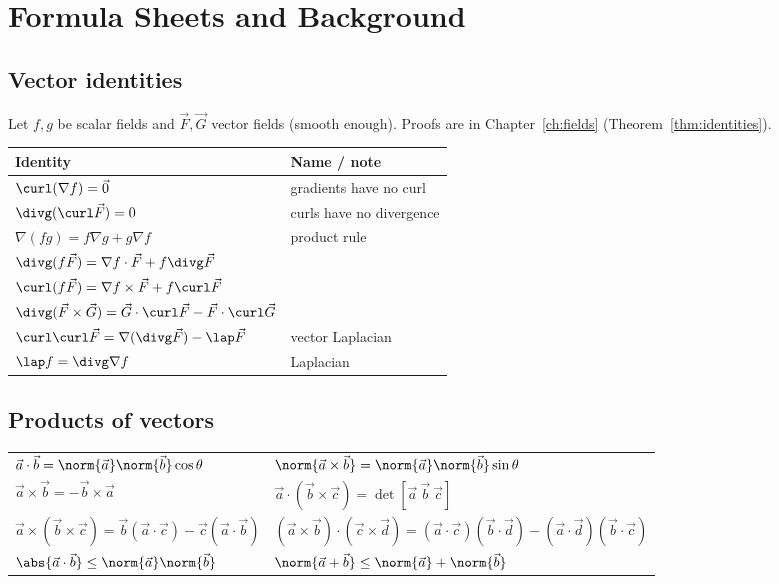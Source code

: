 \chapter{Formula Sheets and Background}
\label{ch:appendix}

\section{Vector identities}

Let $f,g$ be scalar fields and $\vec F,\vec G$ vector fields (smooth enough). Proofs are in Chapter~\ref{ch:fields} (Theorem~\ref{thm:identities}).

\begin{center}
\renewcommand{\arraystretch}{1.5}
\begin{tabular}{ll}
\toprule
\textbf{Identity} & \textbf{Name / note} \\
\midrule
$\curl(\nabla f)=\vec0$ & gradients have no curl \\
$\divg(\curl\vec F)=0$ & curls have no divergence \\
$\nabla(fg)=f\nabla g+g\nabla f$ & product rule \\
$\divg(f\vec F)=\nabla f\cdot\vec F+f\divg\vec F$ & \\
$\curl(f\vec F)=\nabla f\times\vec F+f\curl\vec F$ & \\
$\divg(\vec F\times\vec G)=\vec G\cdot\curl\vec F-\vec F\cdot\curl\vec G$ & \\
$\curl\curl\vec F=\nabla(\divg\vec F)-\lap\vec F$ & vector Laplacian \\
$\lap f=\divg\nabla f$ & Laplacian \\
\bottomrule
\end{tabular}
\end{center}

\section{Products of vectors}

\begin{center}
\renewcommand{\arraystretch}{1.5}
\begin{tabular}{ll}
\toprule
$\vec a\cdot\vec b=\norm{\vec a}\norm{\vec b}\cos\theta$ & $\norm{\vec a\times\vec b}=\norm{\vec a}\norm{\vec b}\sin\theta$ \\
$\vec a\times\vec b=-\vec b\times\vec a$ & $\vec a\cdot(\vec b\times\vec c)=\det[\vec a\ \vec b\ \vec c]$ \\
$\vec a\times(\vec b\times\vec c)=\vec b(\vec a\cdot\vec c)-\vec c(\vec a\cdot\vec b)$ & $(\vec a\times\vec b)\cdot(\vec c\times\vec d)=(\vec a\cdot\vec c)(\vec b\cdot\vec d)-(\vec a\cdot\vec d)(\vec b\cdot\vec c)$ \\
$\abs{\vec a\cdot\vec b}\le\norm{\vec a}\norm{\vec b}$ & $\norm{\vec a+\vec b}\le\norm{\vec a}+\norm{\vec b}$ \\
\bottomrule
\end{tabular}
\end{center}

